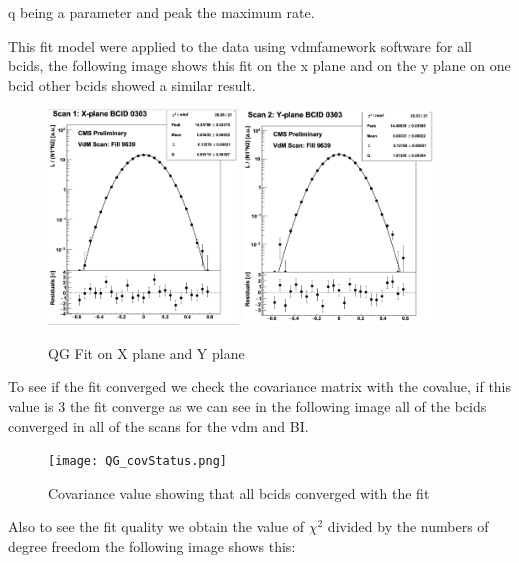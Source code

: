 q being a parameter and peak the maximum rate.

This fit model were applied to the data using vdmfamework software for all bcids, the following image shows this fit on the x plane and on the y plane on one bcid other bcids showed a similar result.

\begin{figure}[H]
    \centering
    \includegraphics[width=0.45\textwidth]{fitqg1.png}
    \includegraphics[width=0.45\textwidth]{fitqg2.png}
    \caption{QG Fit on X plane and Y plane}
    \label{fig:QGfit}
\end{figure}

To see if the fit converged we check the covariance matrix with the covalue, if this value is 3 the fit converge as we can see in the following image all of the bcids converged in all of the scans for the vdm and BI. 
\begin{figure}[H]
    \centering
    \texttt{[image: QG\_covStatus.png]}
    \caption{Covariance value showing that all bcids converged with the fit}
    \label{fig:QGfit}
\end{figure}

Also to see the fit quality we obtain the value of $\chi^{2}$ divided by the numbers of degree freedom the following image shows this: 

